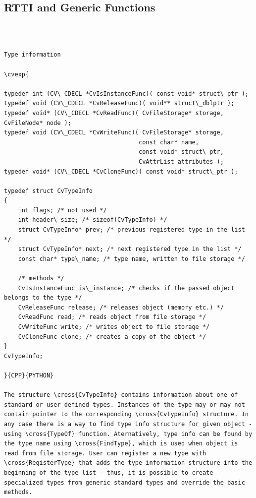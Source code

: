 \subsection{RTTI and Generic Functions}
\begin{verbatim}


\end{verbatim}
\label{CvTypeInfo}
\begin{verbatim}

Type information

\cvexp{

typedef int (CV\_CDECL *CvIsInstanceFunc)( const void* struct\_ptr );
typedef void (CV\_CDECL *CvReleaseFunc)( void** struct\_dblptr );
typedef void* (CV\_CDECL *CvReadFunc)( CvFileStorage* storage, CvFileNode* node );
typedef void (CV\_CDECL *CvWriteFunc)( CvFileStorage* storage,
                                      const char* name,
                                      const void* struct\_ptr,
                                      CvAttrList attributes );
typedef void* (CV\_CDECL *CvCloneFunc)( const void* struct\_ptr );

typedef struct CvTypeInfo
{
    int flags; /* not used */
    int header\_size; /* sizeof(CvTypeInfo) */
    struct CvTypeInfo* prev; /* previous registered type in the list */
    struct CvTypeInfo* next; /* next registered type in the list */
    const char* type\_name; /* type name, written to file storage */

    /* methods */
    CvIsInstanceFunc is\_instance; /* checks if the passed object belongs to the type */
    CvReleaseFunc release; /* releases object (memory etc.) */
    CvReadFunc read; /* reads object from file storage */
    CvWriteFunc write; /* writes object to file storage */
    CvCloneFunc clone; /* creates a copy of the object */
}
CvTypeInfo;

}{CPP}{PYTHON}

The structure \cross{CvTypeInfo} contains information about one of standard or user-defined types. Instances of the type may or may not contain pointer to the corresponding \cross{CvTypeInfo} structure. In any case there is a way to find type info structure for given object - using \cross{TypeOf} function. Aternatively, type info can be found by the type name using \cross{FindType}, which is used when object is read from file storage. User can register a new type with \cross{RegisterType} that adds the type information structure into the beginning of the type list - thus, it is possible to create specialized types from generic standard types and override the basic methods.


\end{verbatim}
